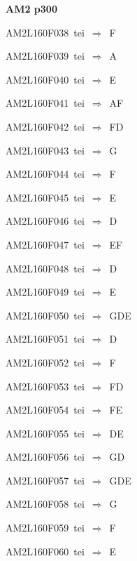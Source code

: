 \par\vfill\eject
{\bf\hfill AM2 p300\hfill\hbox{}}\par\bigskip
{\sixrm AM2L160F038\ {\sixit tei}\ }$\Rightarrow$\ F\par\smallskip
{\sixrm AM2L160F039\ {\sixit tei}\ }$\Rightarrow$\ A\par\smallskip
{\sixrm AM2L160F040\ {\sixit tei}\ }$\Rightarrow$\ E\par\smallskip
{\sixrm AM2L160F041\ {\sixit tei}\ }$\Rightarrow$\ AF\par\smallskip
{\sixrm AM2L160F042\ {\sixit tei}\ }$\Rightarrow$\ FD\par\smallskip
{\sixrm AM2L160F043\ {\sixit tei}\ }$\Rightarrow$\ G\par\smallskip
{\sixrm AM2L160F044\ {\sixit tei}\ }$\Rightarrow$\ F\par\smallskip
{\sixrm AM2L160F045\ {\sixit tei}\ }$\Rightarrow$\ E\par\smallskip
{\sixrm AM2L160F046\ {\sixit tei}\ }$\Rightarrow$\ D\par\smallskip
{\sixrm AM2L160F047\ {\sixit tei}\ }$\Rightarrow$\ EF\par\smallskip
{\sixrm AM2L160F048\ {\sixit tei}\ }$\Rightarrow$\ D\par\smallskip
{\sixrm AM2L160F049\ {\sixit tei}\ }$\Rightarrow$\ E\par\smallskip
{\sixrm AM2L160F050\ {\sixit tei}\ }$\Rightarrow$\ GDE\par\smallskip
{\sixrm AM2L160F051\ {\sixit tei}\ }$\Rightarrow$\ D\par\smallskip
{\sixrm AM2L160F052\ {\sixit tei}\ }$\Rightarrow$\ F\par\smallskip
{\sixrm AM2L160F053\ {\sixit tei}\ }$\Rightarrow$\ FD\par\smallskip
{\sixrm AM2L160F054\ {\sixit tei}\ }$\Rightarrow$\ FE\par\smallskip
{\sixrm AM2L160F055\ {\sixit tei}\ }$\Rightarrow$\ DE\par\smallskip
{\sixrm AM2L160F056\ {\sixit tei}\ }$\Rightarrow$\ GD\par\smallskip
{\sixrm AM2L160F057\ {\sixit tei}\ }$\Rightarrow$\ GDE\par\smallskip
{\sixrm AM2L160F058\ {\sixit tei}\ }$\Rightarrow$\ G\par\smallskip
{\sixrm AM2L160F059\ {\sixit tei}\ }$\Rightarrow$\ F\par\smallskip
{\sixrm AM2L160F060\ {\sixit tei}\ }$\Rightarrow$\ E\par\smallskip

